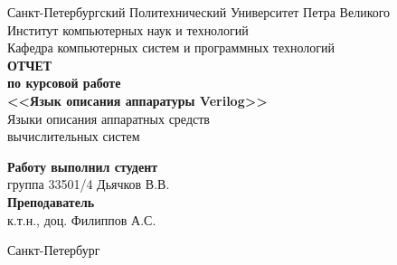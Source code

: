 \begin{titlepage}
\begin{center}
	Санкт-Петербургский Политехнический Университет Петра Великого\\[0.3cm]
	Институт компьютерных наук и технологий \\[0.3cm]
	Кафедра компьютерных систем и программных технологий\\[4cm]
	
	\textbf{ОТЧЕТ}\\ 
	\textbf{по курсовой работе}\\[0.5cm]
	\textbf{<<Язык описания аппаратуры Verilog>>}\\[0.1cm]
	Языки описания аппаратных средств\\ вычислительных систем\\[4.0cm]
\end{center}

\begin{flushright}
	\begin{minipage}{0.45\textwidth}
		\textbf{Работу выполнил студент}\\[3mm]
		группа 33501/4 \hspace*{9mm} Дьячков В.В.\\[5mm]
		\textbf{Преподаватель}\\[5mm]
		\sign[1.5cm] \hspace*{1mm} к.т.н., доц. Филиппов А.С. \\[5mm]
	\end{minipage}
\end{flushright}

\vfill

\begin{center}
	Санкт-Петербург\\
	\the\year
\end{center}
\end{titlepage}

\addtocounter{page}{1}
